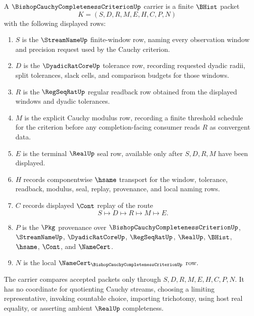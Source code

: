 \begin{definition}
\label{def:bishop-cauchy-completeness-criterion-carrier}
A $\BishopCauchyCompletenessCriterionUp$ carrier is a finite $\BHist$ packet
$$
K=(S,D,R,M,E,H,C,P,N)
$$
with the following displayed rows:
\begin{enumerate}
\item $S$ is the $\StreamNameUp$ finite-window row, naming every observation window and precision request used by the Cauchy criterion.
\item $D$ is the $\DyadicRatCoreUp$ tolerance row, recording requested dyadic radii, split tolerances, slack cells, and comparison budgets for those windows.
\item $R$ is the $\RegSeqRatUp$ regular readback row obtained from the displayed windows and dyadic tolerances.
\item $M$ is the explicit Cauchy modulus row, recording a finite threshold schedule for the criterion before any completion-facing consumer reads $R$ as convergent data.
\item $E$ is the terminal $\RealUp$ seal row, available only after $S,D,R,M$ have been displayed.
\item $H$ records componentwise $\hsame$ transport for the window, tolerance, readback, modulus, seal, replay, provenance, and local naming rows.
\item $C$ records displayed $\Cont$ replay of the route
$$
S \longmapsto D \longmapsto R \longmapsto M \longmapsto E .
$$
\item $P$ is the $\Pkg$ provenance over $\BishopCauchyCompletenessCriterionUp$, $\StreamNameUp$, $\DyadicRatCoreUp$, $\RegSeqRatUp$, $\RealUp$, $\BHist$, $\hsame$, $\Cont$, and $\NameCert$.
\item $N$ is the local $\NameCert_{\BishopCauchyCompletenessCriterionUp}$ row.
\end{enumerate}
The carrier compares accepted packets only through $S,D,R,M,E,H,C,P,N$. It has no coordinate for quotienting Cauchy streams, choosing a limiting representative, invoking countable choice, importing trichotomy, using host real equality, or asserting ambient $\RealUp$ completeness.
\end{definition}

